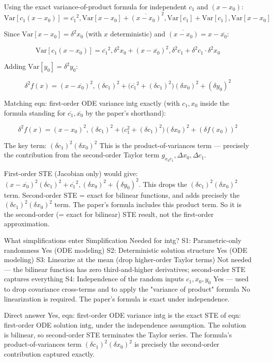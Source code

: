 \documentclass[twoside]{article}
\numberwithin{equation}{section}
\begin{document}
Using the exact variance-of-product formula for independent $c_1$ and $(x - x_0)$:
$$\text{Var}[c_1 (x - x_0)] = \overline{c_1}^2, \text{Var}[x - x_0] + \overline{(x - x_0)}^2, \text{Var}[c_1] + \text{Var}[c_1], \text{Var}[x - x_0]$$

Since $\text{Var}[x - x_0] = \delta^2 x_0$ (with $x$ deterministic) and $\overline{(x - x_0)} = x - \overline{x_0}$:

$$\text{Var}[c_1 (x - x_0)] = \overline{c_1}^2, \delta^2 x_0 + (x - \overline{x_0})^2, \delta^2 c_1 + \delta^2 c_1 \cdot \delta^2 x_0$$

Adding $\text{Var}[y_0] = \delta^2 y_0$:

$$\delta^2 f(x) = (x - \overline{x_0})^2, (\delta c_1)^2 + \bigl(\overline{c_1}^2 + (\delta c_1)^2\bigr)(\delta x_0)^2 + (\delta y_0)^2$$

Matching eqn: first-order ODE variance intg exactly (with $c_1, x_0$ inside the formula standing for $\overline{c_1}, \overline{x_0}$ by the paper's shorthand):

$$\delta^2 f(x) = (x - x_0)^2, (\delta c_1)^2 + \bigl(c_1^2 + (\delta c_1)^2\bigr)(\delta x_0)^2 + (\delta f(x_0))^2$$

The key term: $(\delta c_1)^2 (\delta x_0)^2$
This is the product-of-variances term — precisely the contribution from the second-order Taylor term $g_{x_0 c_1}, \Delta x_0, \Delta c_1$.

First-order STE (Jacobian only) would give: $(x - \overline{x_0})^2 (\delta c_1)^2 + \overline{c_1}^2, (\delta x_0)^2 + (\delta y_0)^2$. This drops the $(\delta c_1)^2 (\delta x_0)^2$ term.
Second-order STE = exact for bilinear functions, and adds precisely the $(\delta c_1)^2 (\delta x_0)^2$ term.
The paper's formula includes this product term. So it is the second-order (= exact for bilinear) STE result, not the first-order approximation.

What simplifications enter
Simplification	Needed for intg?
S1: Parametric-only randomness	Yes (ODE modeling)
S2: Deterministic solution structure	Yes (ODE modeling)
S3: Linearize at the mean (drop higher-order Taylor terms)	Not needed — the bilinear function has zero third-and-higher derivatives; second-order STE captures everything
S4: Independence of the random inputs $c_1, x_0, y_0$	Yes — used to drop covariance cross-terms and to apply the "variance of product" formula
No linearization is required. The paper's formula is exact under independence.

Direct answer
Yes, eqn: first-order ODE variance intg is the exact STE of eqn: first-order ODE solution intg, under the independence assumption. The solution is bilinear, so second-order STE terminates the Taylor series. The formula's product-of-variances term $(\delta c_1)^2 (\delta x_0)^2$ is precisely the second-order contribution captured exactly.
\end{document}
